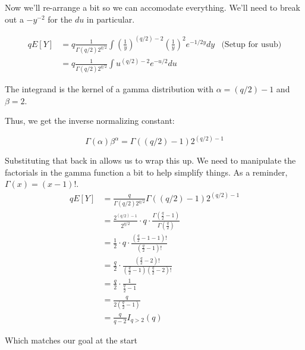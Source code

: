 Now we'll re-arrange a bit so we can accomodate everything. We'll need to break out a $-y^{-2}$ for the $du$ in particular.

\vspace{-0.4cm}
\begin{align*}
	qE[Y] &= q  \frac{1}{\Gamma(q/2)2^{q/2}} \int \left( \frac{1}{y} \right)^{(q/2)-2}  \left( \frac{1}{y} \right)^{2} e^{-1/2y} dy & \text{(Setup for usub)} \\
	&=  q  \frac{1}{\Gamma(q/2)2^{q/2}} \int u^{(q/2) - 2} e^{-u/2} du 
\end{align*}

The integrand is the kernel of a gamma distribution with $\alpha=(q/2) -1$ and $\beta=2$. 

Thus, we get the inverse normalizing constant:

$$ \Gamma(\alpha) \beta^{\alpha} = \Gamma( (q/2)-1 ) 2^{(q/2)-1} $$

Substituting that back in allows us to wrap this up. We need to manipulate the factorials in the gamma function a bit to help simplify things. As a reminder, $\Gamma(x) = (x-1)!$.
\vspace{-0.4cm}
\begin{align*}
	qE[Y] &=  \frac{q}{\Gamma(q/2)2^{q/2}} \Gamma( (q/2)-1 ) 2^{(q/2)-1} \\
	&= \frac{ 2^{(q/2)-1} }{ 2^{q/2} } \cdot q \cdot \frac{\Gamma\left( \frac{q}{2} - 1 \right)}{\Gamma\left( \frac{q}{2} \right)} \\
	&= \frac{1}{2} \cdot q \cdot \frac{\left( \frac{q}{2} - 1 - 1 \right)!}{\left( \frac{q}{2} - 1 \right)!} \\
	&= \frac{q}{2} \cdot \frac{\left( \frac{q}{2} - 2 \right)!}{\left( \frac{q}{2} - 1 \right) \left( \frac{q}{2} - 2 \right)!} \\
	&= \frac{q}{2} \cdot \frac{1}{\frac{q}{2} - 1} \\
	&= \frac{q}{2\left( \frac{q}{2} - 1 \right)} \\
	&= \frac{q}{q - 2} I_{q > 2}(q)
\end{align*}


Which matches our goal at the start
